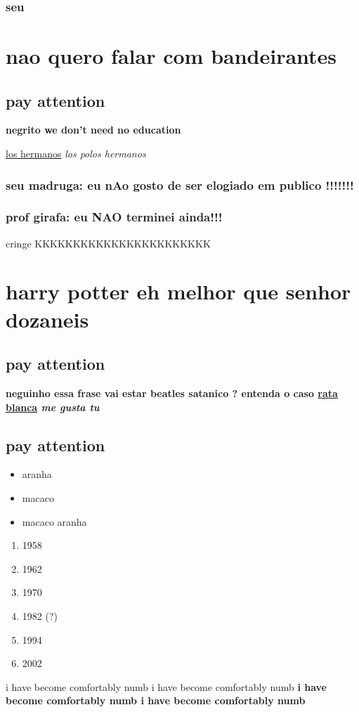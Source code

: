 \documentclass[12pt]{article} %
\begin{document}
\subsection{seu}
\chapter{nao quero falar com bandeirantes}
\section{pay attention}
\bf{negrito} we don't need no education\par 
\underline{los hermanos} \it{los polos hermanos}\par
\subsection{seu madruga: eu nAo gosto de ser elogiado em publico !!!!!!!}
\subsection{prof girafa: eu NAO terminei ainda!!!}
cringe KKKKKKKKKKKKKKKKKKKKKKK\par
\chapter{harry potter eh melhor que senhor dozaneis}
\section{pay attention}
\bf{neguinho essa frase vai estar} beatles satanico ? entenda o caso 
\underline{rata blanca} \it{me gusta tu}\par
\section{pay attention}
\begin{itemize} 
\item aranha 
\item macaco
\item macaco aranha
\end{itemize}
\begin{enumerate} 
\item 1958
\item 1962
\item 1970
\item 1982 (?)
\item 1994
\item 2002
\end{enumerate}
i have become comfortably numb
i have become comfortably numb \bf{i have become comfortably numb}
i have become comfortably numb \par
\end{document}
